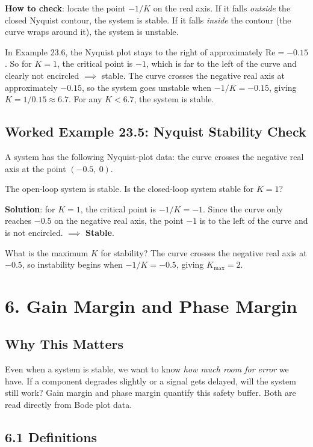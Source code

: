 \documentclass[11pt]{article}
\begin{document}
\textbf{How to check}: locate the point $-1/K$ on the real axis. If it falls \textit{outside} the closed Nyquist contour, the system is stable. If it falls \textit{inside} the contour (the curve wraps around it), the system is unstable.

In Example 23.6, the Nyquist plot stays to the right of approximately $\mathrm{Re} = -0.15$. So for $K = 1$, the critical point is $-1$, which is far to the left of the curve and clearly not encircled $\implies$ stable. The curve crosses the negative real axis at approximately $-0.15$, so the system goes unstable when $-1/K = -0.15$, giving $K = 1/0.15 \approx 6.7$. For any $K < 6.7$, the system is stable.

\subsection*{Worked Example 23.5: Nyquist Stability Check}

A system has the following Nyquist-plot data: the curve crosses the negative real axis at the point $(-0.5,\ 0)$.

The open-loop system is stable. Is the closed-loop system stable for $K = 1$?

\textbf{Solution}: for $K = 1$, the critical point is $-1/K = -1$. Since the curve only reaches $-0.5$ on the negative real axis, the point $-1$ is to the left of the curve and is not encircled. $\implies$ \textbf{Stable}.

What is the maximum $K$ for stability? The curve crosses the negative real axis at $-0.5$, so instability begins when $-1/K = -0.5$, giving $K_{\max} = 2$.

\section*{6. Gain Margin and Phase Margin}

\subsection*{Why This Matters}

Even when a system is stable, we want to know \textit{how much room for error} we have. If a component degrades slightly or a signal gets delayed, will the system still work? Gain margin and phase margin quantify this safety buffer. Both are read directly from Bode plot data.

\subsection*{6.1 Definitions}
\end{document}
